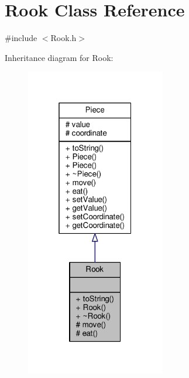 \hypertarget{class_rook}{}\section{Rook Class Reference}
\label{class_rook}


{\ttfamily \#include $<$Rook.\+h$>$}



Inheritance diagram for Rook\+:\nopagebreak
\begin{figure}[H]
\begin{center}
\leavevmode
\includegraphics[width=172pt]{class_rook__inherit__graph}
\end{center}
\end{figure}


